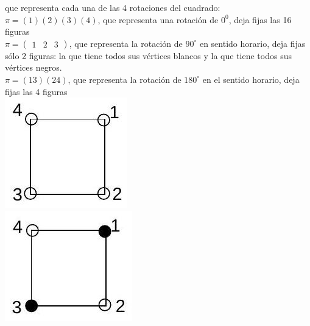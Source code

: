 \documentclass[10pt]{article}
\begin{document}
que representa cada una de las 4 rotaciones del cuadrado:\\
$\pi=(1)(2)(3)(4)$, que representa una rotación de $0^{0}$, deja fijas las 16 figuras\\
$\pi=\left(\begin{array}{lll}1 & 2 & 3\end{array}\right)$, que representa la rotación de $90^{\circ}$ en sentido horario, deja fijas sólo 2 figuras: la que tiene todos sus vértices blancos y la que tiene todos sus vértices negros.\\
$\pi=(13)(24)$, que representa la rotación de $180^{\circ}$ en el sentido horario, deja fijas las 4 figuras\\
\includegraphics[max width=\textwidth, center]{2025_09_05_3ba26226ec0baddb5a03g-53(2)}\\
\includegraphics[max width=\textwidth, center]{2025_09_05_3ba26226ec0baddb5a03g-53}\\
\end{document}
